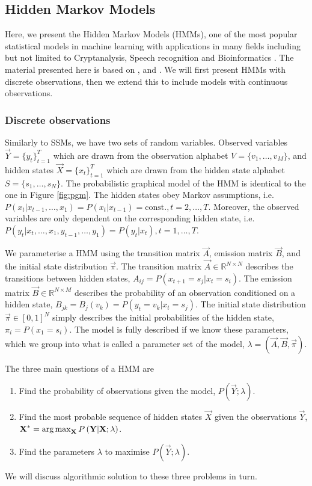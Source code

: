 \subsection{Hidden Markov Models}
	Here, we present the Hidden Markov Models (HMMs), one of the most popular statistical models in machine learning with applications in many fields including but not limited to Cryptanalysis, Speech recognition and Bioinformatics \cite{wiki:HMM}. The material presented here is based on \cite{rabiner1989tutorial}, \cite{ramage07} and \cite{mlBook}. We will first present HMMs with discrete observations, then we extend this to include models with continuous observations.
	
\subsubsection{Discrete observations}
	Similarly to SSMs, we have two sets of random variables. Observed variables $\vec Y = \{ y_t \}_{t = 1}^T$ which are drawn from the observation alphabet $V = \{v_1, \dotsc, v_M\}$, and hidden states $\vec X = \{ x_t \}_{t = 1}^T$ which are drawn from the hidden state alphabet $S = \{ s_1, \dotsc, s_N \}$. The probabilistic graphical model of the HMM is identical to the one in Figure \ref{fig:pgm}. The hidden states obey Markov assumptions, i.e. $P( x_t | x_{t - 1}, \dotsc, x_1) = P(x_t | x_{t - 1}) = \text{const.}, t = 2, \dotsc, T$. Moreover, the observed variables are only dependent on the corresponding hidden state, i.e. $P( y_t | x_t, \dotsc, x_1, y_{t - 1}, \dotsc, y_1) = P(y_t | x_t), t = 1, \dotsc, T$.
	
	We parameterise a HMM using the transition matrix $\vec A$, emission matrix $\vec B$, and the initial state distribution $\vec \pi$. The transition matrix $\vec A \in \mathbb{R}^{N \times N}$ describes the transitions between hidden states, $A_{ij} = P(x_{t + 1} = s_j | x_t = s_i)$. The emission matrix $\vec B \in \mathbb{R}^{N \times M}$ describes the probability of an observation conditioned on a hidden state, $B_{jk} = B_{j}(v_k) = P(y_t = v_k | x_t = s_j)$. The initial state distribution $\vec \pi \in [0, 1]^N$ simply describes the initial probabilities of the hidden state, $\pi_i = P(x_1 = s_i)$. The model is fully described if we know these parameters, which we group into what is called a parameter set of the model, $\lambda = (\vec A, \vec B, \vec \pi)$.
	
	The three main questions of a HMM are
	\begin{enumerate}
		\item Find the probability of observations given the model, $P\left(\vec Y; \lambda\right)$.
		\item Find the most probable sequence of hidden states $\vec X$ given the observations $\vec Y$, $\boldsymbol{\mathbf{X}}^\ast = \operatorname*{arg\,max}_{\boldsymbol{\mathbf{X}}} P\left(\boldsymbol{\mathbf{Y}} | \boldsymbol{\mathbf{X}}; \lambda\right)$.
		\item Find the parameters $\lambda$ to maximise $P\left(\vec Y; \lambda\right)$.
	\end{enumerate}
	We will discuss algorithmic solution to these three problems in turn.

